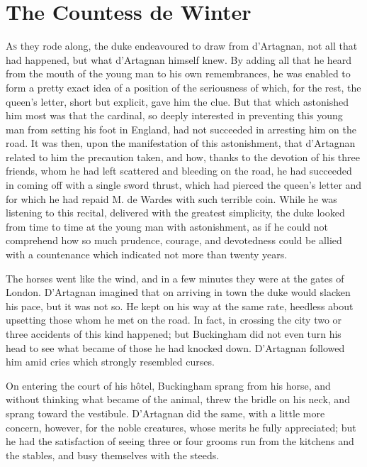 
\chapter{The Countess de Winter}

\lettrine[]{A}{s} they rode along, the duke endeavoured to draw from d'Artagnan, not all that had happened, but what d'Artagnan himself knew. By adding all that he heard from the mouth of the young man to his own remembrances, he was enabled to form a pretty exact idea of a position of the seriousness of which, for the rest, the queen's letter, short but explicit, gave him the clue. But that which astonished him most was that the cardinal, so deeply interested in preventing this young man from setting his foot in England, had not succeeded in arresting him on the road. It was then, upon the manifestation of this astonishment, that d'Artagnan related to him the precaution taken, and how, thanks to the devotion of his three friends, whom he had left scattered and bleeding on the road, he had succeeded in coming off with a single sword thrust, which had pierced the queen's letter and for which he had repaid M. de Wardes with such terrible coin. While he was listening to this recital, delivered with the greatest simplicity, the duke looked from time to time at the young man with astonishment, as if he could not comprehend how so much prudence, courage, and devotedness could be allied with a countenance which indicated not more than twenty years. 

The horses went like the wind, and in a few minutes they were at the gates of London. D'Artagnan imagined that on arriving in town the duke would slacken his pace, but it was not so. He kept on his way at the same rate, heedless about upsetting those whom he met on the road. In fact, in crossing the city two or three accidents of this kind happened; but Buckingham did not even turn his head to see what became of those he had knocked down. D'Artagnan followed him amid cries which strongly resembled curses. 

On entering the court of his hôtel, Buckingham sprang from his horse, and without thinking what became of the animal, threw the bridle on his neck, and sprang toward the vestibule. D'Artagnan did the same, with a little more concern, however, for the noble creatures, whose merits he fully appreciated; but he had the satisfaction of seeing three or four grooms run from the kitchens and the stables, and busy themselves with the steeds. 

